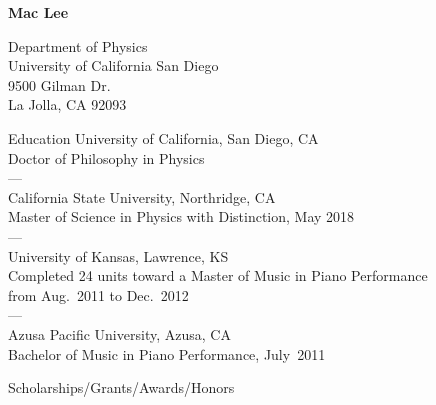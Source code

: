 \documentclass{cv}
\begin{document}

\centerline{\LARGE{\bfseries Mac Lee}}
\vspace{11pt}
\begin{minipage}[t]{0.4\textwidth}
  Department of Physics\\
  University of California San Diego\\
  9500 Gilman Dr.\\
  La Jolla, CA 92093\\
\end{minipage}
\hfill
\begin{minipage}[t]{0.4\textwidth}
\end{minipage}

\begin{block}{Education}
  University of California, San Diego, CA\\
  Doctor of Philosophy in Physics\\
  ---\\
  California State University, Northridge, CA\\
  Master of Science in Physics with Distinction, May 2018\\
  ---\\
  University of Kansas, Lawrence, KS\\
  Completed 24 units toward a Master of Music in Piano Performance\\
  from Aug.~2011 to Dec.~2012\\
  ---\\
  Azusa Pacific University, Azusa, CA\\
  Bachelor of Music in Piano Performance, July~2011
\end{block}

\begin{block}{Scholarships/Grants/Awards/Honors}
  \begin{entries}
  \end{entries}
\end{block}
\end{document}

